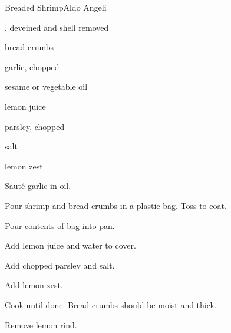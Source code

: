 \begin{recipe}{Breaded Shrimp}{Aldo Angeli}{}

\begin{ingredients}
\item {}, deveined and shell removed
\item bread crumbs
\item garlic, chopped
\item sesame or vegetable oil
\item lemon juice
\item parsley, chopped
\item salt
\item lemon zest
\end{ingredients}

\begin{directions}
\item Sauté garlic in oil.
\item Pour shrimp and bread crumbs in a plastic bag. Toss to coat.
\item Pour contents of bag into pan.
\item Add lemon juice and water to cover.
\item Add chopped parsley and salt.
\item Add lemon zest.
\item Cook until done. Bread crumbs should be moist and thick.
\item Remove lemon rind.
\end{directions}

\end{recipe}
